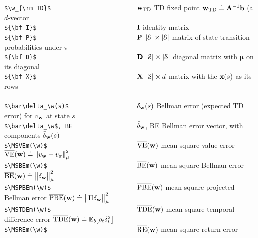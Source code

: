 \documentclass[10pt,fleqn]{article}
\begin{document}
\begin{tabbing}
\>\verb+$\w_{\rm TD}$                        +\>$\w_{\rm TD}$       \> TD fixed point $\w_{\rm TD}\defeq {\bf A}^{-1}{\bf b}$ (a $d$-vector\\
\>\verb+${\bf I}$                            +\>${\bf I}$           \> identity matrix\\
\>\verb+${\bf P}$                            +\>${\bf P}$           \> $|\S|\times |\S|$ matrix of state-transition probabilities under $\pi$\\
\>\verb+${\bf D}$                            +\>${\bf D}$           \> $|\S|\times |\S|$ diagonal matrix with $\bm\mu$ on its diagonal\\
\>\verb+${\bf X}$                            +\>${\bf X}$           \> $|\S|\times d$ matrix with the $\x(s)$ as its rows\\
\\
\>\verb#$\bar\delta_\w(s)$                   #\>$\bar\delta_\w(s)$  \> Bellman error (expected TD error) for $v_\w$ at state $s$\\
\>\verb#$\bar\delta_\w$, BE                  #\>$\bar\delta_\w$, BE \> Bellman error vector, with components $\bar\delta_\w(s)$\\
\>\verb+$\MSVEm(\w)$                         +\>$\MSVEm(\w)$        \> mean square value error $\MSVEm(\w)\defeq\norm{v_\w-\vpi}$\\
\>\verb+$\MSBEm(\w)$                         +\>$\MSBEm(\w)$        \> mean square Bellman error $\MSBEm(\w)\defeq\norm{\bar\delta_\w}$\\
\>\verb+$\MSPBEm(\w)$                        +\>$\MSPBEm(\w)$       \> mean square projected Bellman error $\MSPBEm(\w)\defeq\norm{\Pi\bar\delta_\w}$\\
\>\verb+$\MSTDEm(\w)$                        +\>$\MSTDEm(\w)$       \> mean square temporal-difference error $\MSTDEm(\w)\defeq\EE{b}{\rho_t\delta_t^2}$ \\
\>\verb+$\MSREm(\w)$                         +\>$\MSREm(\w)$        \> mean square return error\\
\end{tabbing}
\end{document}
